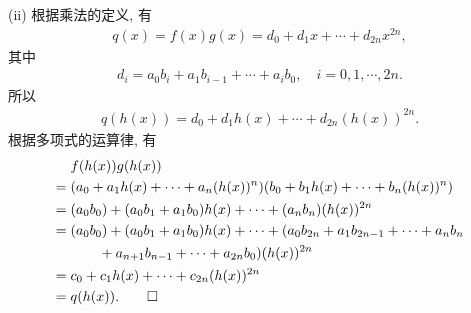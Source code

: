 \begin{pf}
    (ii) 根据乘法的定义, 有
    \begin{align*}
        q(x) = f(x) g(x) = d_0 + d_1 x + \cdots + d_{2n} x^{2n},
    \end{align*}
    其中
    \begin{align*}
        d_i = a_0 b_i + a_1 b_{i-1} + \cdots + a_i b_0, \quad i = 0,1,\cdots,2n.
    \end{align*}
    所以
    \begin{align*}
        q(h(x)) = d_0 + d_1 h(x) + \cdots + d_{2n} (h(x))^{2n}.
    \end{align*}
    根据多项式的运算律, 有
    \begin{align*}
             & f(h(x)) g(h(x))                                                                               \\
        = {} & (a_0 + a_1 h(x) + \cdots + a_n (h(x))^n) (b_0 + b_1 h(x) + \cdots + b_n (h(x))^n)             \\
        = {} & (a_0 b_0) + (a_0 b_1 + a_1 b_0) h(x) + \cdots + (a_n b_n) (h(x))^{2n}                         \\
        = {} & (a_0 b_0) + (a_0 b_1 + a_1 b_0) h(x) + \cdots + (a_0 b_{2n} + a_1 b_{2n-1} + \cdots + a_n b_n \\
             & \qquad + a_{n+1} b_{n-1} + \cdots + a_{2n} b_0) (h(x))^{2n}                                   \\
        = {} & c_0 + c_1 h(x) + \cdots + c_{2n} (h(x))^{2n}                                                  \\
        = {} & q(h(x)). \qedhere
    \end{align*}

\end{pf}

